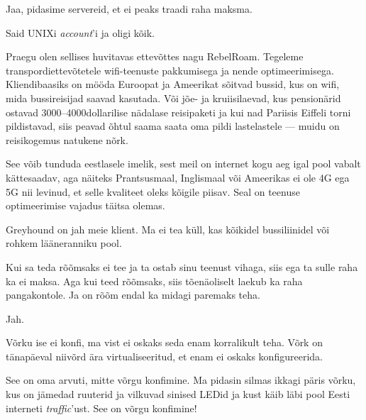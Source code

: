 
Jaa, pidasime servereid, et ei peaks traadi raha maksma.


Said UNIXi \emph{account}'i ja oligi kõik.


Praegu olen sellises huvitavas ettevõttes nagu RebelRoam. 
Tegeleme transpordiettevõtetele wifi-teenuste pakkumisega ja nende 
optimeerimisega. Kliendibaasiks on mööda Euroopat ja Ameerikat 
sõitvad bussid, kus on wifi, mida bussireisijad saavad kasutada. 
Või jõe- ja kruiisilaevad, kus pensionärid ostavad 3000--4000dollarilise nädalase reisipaketi ja kui nad Pariisis Eiffeli torni 
pildistavad, siis peavad õhtul saama saata oma pildi lastelastele --- muidu on 
reisikogemus natukene nõrk. 

See võib tunduda eestlasele imelik, sest meil on internet kogu aeg igal pool 
vabalt kättesaadav, aga näiteks Prantsusmaal, Inglismaal või Ameerikas ei 
ole 4G ega 5G nii levinud, et selle kvaliteet oleks kõigile piisav. Seal 
on teenuse optimeerimise vajadus täitsa olemas.


Greyhound on jah meie klient. Ma ei tea küll, kas kõikidel bussiliinidel või rohkem 
lääneranniku pool.


Kui sa teda rõõmsaks ei tee ja ta ostab sinu teenust vihaga, siis ega ta sulle raha
ka ei maksa. Aga kui teed rõõmsaks, siis tõenäoliselt laekub ka raha 
pangakontole. Ja on rõõm endal ka midagi paremaks teha.


Jah.


Võrku ise ei konfi, ma vist ei oskaks seda enam korralikult teha. Võrk on 
tänapäeval niivõrd ära virtualiseeritud, et enam ei oskaks konfigureerida.


See on oma arvuti, mitte võrgu konfimine. Ma pidasin silmas
ikkagi päris võrku, kus on jämedad ruuterid ja vilkuvad sinised LEDid ja kust käib 
läbi pool Eesti interneti \emph{traffic}'ust. See on võrgu 
konfimine! 